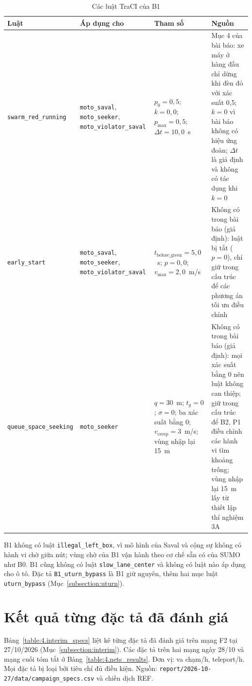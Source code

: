 \documentclass[../DoAn.tex]{subfiles}
\begin{document}
\begin{table}[H]
\centering
\small
\begin{tabular}{|p{3.2cm}|p{3.4cm}|p{3.0cm}|p{3.4cm}|}
\hline
\textbf{Luật} & \textbf{Áp dụng cho} & \textbf{Tham số} & \textbf{Nguồn} \\ \hline
\texttt{swarm\_\allowbreak red\_\allowbreak running} & \texttt{moto\_\allowbreak saval}, \texttt{moto\_\allowbreak seeker}, \texttt{moto\_\allowbreak violator\_\allowbreak saval} & $p_0 = 0{,}5$; $k = 0{,}0$; $p_{\max} = 0{,}5$; $\Delta t = 10{,}0$~s & Mục 4 của bài báo: xe máy ở hàng đầu chỉ dừng khi đèn đỏ với xác suất 0,5; $k = 0$ vì bài báo không có hiệu ứng đoàn; $\Delta t$ là giả định và không có tác dụng khi $k = 0$ \\ \hline
\texttt{early\_\allowbreak start} & \texttt{moto\_\allowbreak saval}, \texttt{moto\_\allowbreak seeker}, \texttt{moto\_\allowbreak violator\_\allowbreak saval} & $t_{\text{before\_green}} = 5{,}0$~s; $p = 0{,}0$; $v_{\max} = 2{,}0$~m/s & Không có trong bài báo (giả định): luật bị tắt ($p = 0$), chỉ giữ trong cấu trúc để các phương án tối ưu điều chỉnh \\ \hline
\texttt{queue\_\allowbreak space\_\allowbreak seeking} & \texttt{moto\_\allowbreak seeker} & $q = 30$~m; $t_{g} = 0$; $\sigma = 0$; ba xác suất bằng 0; $v_{\text{creep}} = 3$~m/s; vùng nhập lại 15~m & Không có trong bài báo (giả định): mọi xác suất bằng 0 nên luật không can thiệp; giữ trong cấu trúc để B2, P1 điều chỉnh các hành vi tìm khoảng trống; vùng nhập lại 15~m lấy từ thiết lập thí nghiệm 3A \\ \hline
\end{tabular}
\caption{Các luật TraCI của B1}
\label{table:appendix_b1_rules}
\end{table}

B1 không có luật \texttt{illegal\_\allowbreak left\_\allowbreak box}, vì mô hình của Saval và cộng sự không có hành vi chờ giữa nút; vùng chờ của B1 vận hành theo cơ chế sẵn có của SUMO như B0. B1 cũng không có luật \texttt{slow\_\allowbreak lane\_\allowbreak center} và không có luật nào áp dụng cho ô tô. Đặc tả \texttt{B1\_uturn\_bypass} là B1 giữ nguyên, thêm hai mục luật \texttt{uturn\_bypass} (Mục~\ref{subsection:uturn}).


\section{Kết quả từng đặc tả đã đánh giá}
\label{section:appendix_specs}

Bảng~\ref{table:4.interim_specs} liệt kê từng đặc tả đã đánh giá trên mạng F2 tại 27/10/2026 (Mục~\ref{subsection:interim}). Các đặc tả trên hai mạng ngày 28/10 và mạng cuối tóm tắt ở Bảng~\ref{table:4.nets_results}. Đơn vị: va chạm/h, teleport/h. Mọi đặc tả bị loại bởi tiêu chí đủ điều kiện. Nguồn: \texttt{report/2026-10-27/data/campaign\_specs.csv} và chiến dịch REF.
\end{document}
